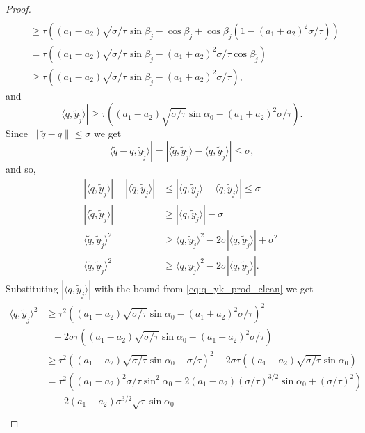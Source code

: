 \documentclass[12pt]{article}
\theoremstyle{remark}
\newcommand{\abs}[1]{\left\vert #1 \right\vert}
\newcommand{\lrangle}[1]{\langle #1 \rangle}
\begin{document}
\begin{appendices}
\begin{proof}
\begin{align*}
 \\
 &\geq\tau\left((a_1-a_2)\sqrt{\sigma/\tau}\sin \beta_{\tilde j}-\cos \beta_{\tilde j} + \cos \beta_{\tilde j}(1- (a_1+a_2)^2\sigma /\tau) \right)
 \\
 &= \tau \left((a_1-a_2)\sqrt{\sigma/\tau}\sin \beta_{\tilde j} -(a_1+a_2)^2\sigma/\tau \cos\beta_{\tilde j}\right)
 \\
 &\geq \tau \left((a_1-a_2)\sqrt{\sigma/\tau}\sin \beta_{\tilde j} -(a_1+a_2)^2\sigma/\tau \right) 
,\end{align*}
and
\begin{equation}\label{eq:q_yk_prod_clean}
    |\langle q, \tilde{y}_{\tilde j} \rangle| \geq \tau \left((a_1-a_2)\sqrt{\sigma/\tau}\sin \alpha_0 -(a_1+a_2)^2\sigma/\tau \right) 
.\end{equation}
Since 
$\|\tilde{q} - q\| \leq \sigma $
we get 
$$\abs{\lrangle{\tilde q - q, \tilde y_{\tilde j}}} = |\langle \tilde{q}, \tilde{y}_{\tilde j}\rangle - \langle q, \tilde{y}_{\tilde j}\rangle| \leq\sigma,$$
and so,
\begin{align*}
|\langle q, \tilde{y}_{\tilde j}\rangle| - |\langle \tilde{q}, \tilde{y}_{\tilde j}\rangle|&\leq |\langle q, \tilde{y}_{\tilde j}\rangle - \langle \tilde{q}, \tilde{y}_{\tilde j}\rangle| \leq  \sigma\\
|\langle \tilde{q}, \tilde{y}_{\tilde j}\rangle|&\geq |\langle q, \tilde{y}_{\tilde j}\rangle| - \sigma\\
\langle \tilde{q}, \tilde{y}_{\tilde j}\rangle^2&\geq \langle q, \tilde{y}_{\tilde j}\rangle^2 - 2\sigma|\langle q, \tilde{y}_{\tilde j}\rangle| + \sigma^2\\
\langle \tilde{q}, \tilde{y}_{\tilde j}\rangle^2&\geq \langle q, \tilde{y}_{\tilde j}\rangle^2 - 2\sigma|\langle q, \tilde{y}_{\tilde j}\rangle|
.\end{align*}
 Substituting $\abs{\lrangle{q, \tilde y_{\tilde j}}}$ with the bound from \eqref{eq:q_yk_prod_clean} we get
\begin{align*}
    \lrangle{\tilde q, \tilde y_{\tilde j}}^2 & \geq \tau^2 \left((a_1-a_2)\sqrt{\sigma/\tau}\sin \alpha_0 -  (a_1+a_2)^2{\sigma/\tau}\right)^2 \\&~~~ - 2\sigma\tau \left((a_1-a_2)\sqrt{\sigma/\tau}\sin \alpha_0 -  (a_1+a_2)^2{\sigma/\tau}\right) \\
    &\geq \tau^2\left((a_1-a_2)\sqrt{\sigma/\tau}\sin \alpha_0 -  {\sigma/\tau}\right)^2 - 2\sigma\tau \left((a_1-a_2)\sqrt{\sigma/\tau}\sin \alpha_0\right)\\
    &= \tau^2 \left((a_1-a_2)^2{\sigma/\tau}\sin^2 \alpha_0 - 2(a_1-a_2)(\sigma/\tau)^{3/2}\sin\alpha_0 + (\sigma/\tau)^2\right) \\&~~~ -2(a_1-a_2)\sigma^{3/2}\sqrt{\tau} \sin \alpha_0 \\

\end{align*}
\end{proof}
\end{appendices}
\end{document}
